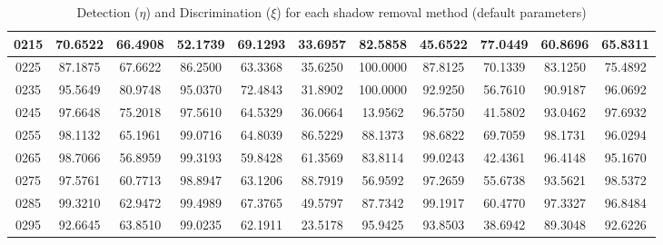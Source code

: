 \begin{appendices}
\begin{table}
\begin{tabular}{ |c|c|c|c|c|c|c|c|c|c|c| }
\hline
0215 &  70.6522 &  66.4908 &   52.1739 &  69.1293 &   33.6957 &  82.5858 &   45.6522 &  77.0449 &   60.8696 &  65.8311    \\
\hline
0225 &  87.1875 &  67.6622 &   86.2500 &  63.3368 &   35.6250 &  100.0000 &   87.8125 &  70.1339 &   83.1250 &  75.4892    \\
\hline
0235 &  95.5649 &  80.9748 &   95.0370 &  72.4843 &   31.8902 &  100.0000 &   92.9250 &  56.7610 &   90.9187 &  96.0692    \\
\hline
0245 &  97.6648 &  75.2018 &   97.5610 &  64.5329 &   36.0664 &  13.9562 &   96.5750 &  41.5802 &   93.0462 &  97.6932    \\
\hline
0255 &  98.1132 &  65.1961 &   99.0716 &  64.8039 &   86.5229 &  88.1373 &   98.6822 &  69.7059 &   98.1731 &  96.0294    \\
\hline
0265 &  98.7066 &  56.8959 &   99.3193 &  59.8428 &   61.3569 &  83.8114 &   99.0243 &  42.4361 &   96.4148 &  95.1670    \\
\hline
0275 &  97.5761 &  60.7713 &   98.8947 &  63.1206 &   88.7919 &  56.9592 &   97.2659 &  55.6738 &   93.5621 &  98.5372    \\
\hline
0285 &  99.3210 &  62.9472 &   99.4989 &  67.3765 &   49.5797 &  87.7342 &   99.1917 &  60.4770 &   97.3327 &  96.8484    \\
\hline
0295 &  92.6645 &  63.8510 &   99.0235 &  62.1911 &   23.5178 &  95.9425 &   93.8503 &  38.6942 &   89.3048 &  92.6226    \\
\hline
\end{tabular}
\caption*{Detection ($\eta$) and Discrimination ($\xi$) for each shadow removal method (default parameters)}
\end{table}


\end{appendices}

